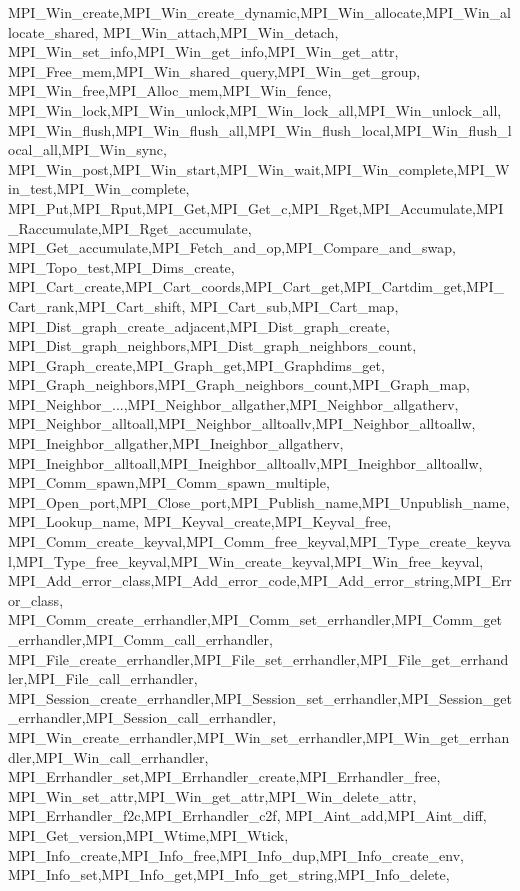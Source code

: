 {{{{{    %
    MPI_Win_create,MPI_Win_create_dynamic,MPI_Win_allocate,MPI_Win_allocate_shared,
    MPI_Win_attach,MPI_Win_detach,
    MPI_Win_set_info,MPI_Win_get_info,MPI_Win_get_attr,
    MPI_Free_mem,MPI_Win_shared_query,MPI_Win_get_group,
    MPI_Win_free,MPI_Alloc_mem,MPI_Win_fence,
    MPI_Win_lock,MPI_Win_unlock,MPI_Win_lock_all,MPI_Win_unlock_all,
    MPI_Win_flush,MPI_Win_flush_all,MPI_Win_flush_local,MPI_Win_flush_local_all,MPI_Win_sync,
    MPI_Win_post,MPI_Win_start,MPI_Win_wait,MPI_Win_complete,MPI_Win_test,MPI_Win_complete,
    MPI_Put,MPI_Rput,MPI_Get,MPI_Get_c,MPI_Rget,MPI_Accumulate,MPI_Raccumulate,MPI_Rget_accumulate,
    MPI_Get_accumulate,MPI_Fetch_and_op,MPI_Compare_and_swap,
    MPI_Topo_test,MPI_Dims_create,
    MPI_Cart_create,MPI_Cart_coords,MPI_Cart_get,MPI_Cartdim_get,MPI_Cart_rank,MPI_Cart_shift,
    MPI_Cart_sub,MPI_Cart_map,
    MPI_Dist_graph_create_adjacent,MPI_Dist_graph_create,
    MPI_Dist_graph_neighbors,MPI_Dist_graph_neighbors_count,
    MPI_Graph_create,MPI_Graph_get,MPI_Graphdims_get,
    MPI_Graph_neighbors,MPI_Graph_neighbors_count,MPI_Graph_map,
    MPI_Neighbor_...,MPI_Neighbor_allgather,MPI_Neighbor_allgatherv,
    MPI_Neighbor_alltoall,MPI_Neighbor_alltoallv,MPI_Neighbor_alltoallw,
    MPI_Ineighbor_allgather,MPI_Ineighbor_allgatherv,
    MPI_Ineighbor_alltoall,MPI_Ineighbor_alltoallv,MPI_Ineighbor_alltoallw,
    MPI_Comm_spawn,MPI_Comm_spawn_multiple,
    MPI_Open_port,MPI_Close_port,MPI_Publish_name,MPI_Unpublish_name,MPI_Lookup_name,
    MPI_Keyval_create,MPI_Keyval_free,
    MPI_Comm_create_keyval,MPI_Comm_free_keyval,MPI_Type_create_keyval,MPI_Type_free_keyval,MPI_Win_create_keyval,MPI_Win_free_keyval,
    MPI_Add_error_class,MPI_Add_error_code,MPI_Add_error_string,MPI_Error_class,
    MPI_Comm_create_errhandler,MPI_Comm_set_errhandler,MPI_Comm_get_errhandler,MPI_Comm_call_errhandler,
    MPI_File_create_errhandler,MPI_File_set_errhandler,MPI_File_get_errhandler,MPI_File_call_errhandler,
    MPI_Session_create_errhandler,MPI_Session_set_errhandler,MPI_Session_get_errhandler,MPI_Session_call_errhandler,
    MPI_Win_create_errhandler,MPI_Win_set_errhandler,MPI_Win_get_errhandler,MPI_Win_call_errhandler,
    MPI_Errhandler_set,MPI_Errhandler_create,MPI_Errhandler_free,
    MPI_Win_set_attr,MPI_Win_get_attr,MPI_Win_delete_attr,
    MPI_Errhandler_f2c,MPI_Errhandler_c2f,
    MPI_Aint_add,MPI_Aint_diff,
    MPI_Get_version,MPI_Wtime,MPI_Wtick,
    MPI_Info_create,MPI_Info_free,MPI_Info_dup,MPI_Info_create_env,
    MPI_Info_set,MPI_Info_get,MPI_Info_get_string,MPI_Info_delete,
}}}}}

